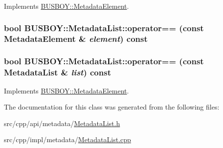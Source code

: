 Implements \hyperlink{classBUSBOY_1_1MetadataElement_a9895dfd3f251e26e8d818871405ce4c7}{BUSBOY::MetadataElement}.\hypertarget{classBUSBOY_1_1MetadataList_a60686cfb013109fed391c0972b9077eb}{
\subsubsection[{operator==}]{\setlength{\rightskip}{0pt plus 5cm}bool BUSBOY::MetadataList::operator== (const {\bf MetadataElement} \& {\em element}) const}}
\label{classBUSBOY_1_1MetadataList_a60686cfb013109fed391c0972b9077eb}
\hypertarget{classBUSBOY_1_1MetadataList_a7dbea89ac583ce3f8900474f22aba2de}{
\subsubsection[{operator==}]{\setlength{\rightskip}{0pt plus 5cm}bool BUSBOY::MetadataList::operator== (const {\bf MetadataList} \& {\em list}) const}}
\label{classBUSBOY_1_1MetadataList_a7dbea89ac583ce3f8900474f22aba2de}


Implements \hyperlink{classBUSBOY_1_1MetadataElement_ac56f20521c49259ff043c2d69bc4c08e}{BUSBOY::MetadataElement}.

The documentation for this class was generated from the following files:\begin{DoxyCompactItemize}
\item 
src/cpp/api/metadata/\hyperlink{MetadataList_8h}{MetadataList.h}\item 
src/cpp/impl/metadata/\hyperlink{MetadataList_8cpp}{MetadataList.cpp}\end{DoxyCompactItemize}
